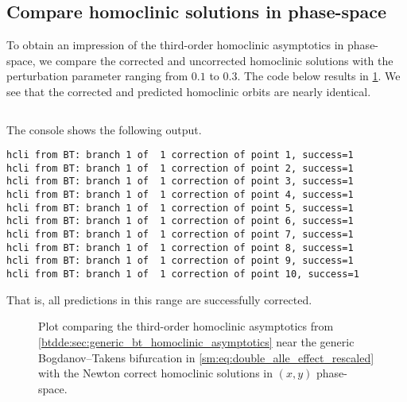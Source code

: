 \subsection{Compare homoclinic solutions in phase-space}
To obtain an impression of the third-order homoclinic asymptotics in
phase-space, we compare the corrected and uncorrected homoclinic solutions
with the perturbation parameter ranging from $0.1$ to $0.3$.
The code below results in \cref{sm:fig:DoubleAlleeEffectCompareOrbitsPhaseSpace}.
We see that the corrected and predicted homoclinic orbits are nearly identical.
\inputminted[firstline=166, lastline=182]{MATLAB}{\pathToDDEBifToolDemos/predator_prey/predator_prey.m}
The \MATLAB console shows the following output.
\begin{verbatim}
hcli from BT: branch 1 of  1 correction of point 1, success=1
hcli from BT: branch 1 of  1 correction of point 2, success=1
hcli from BT: branch 1 of  1 correction of point 3, success=1
hcli from BT: branch 1 of  1 correction of point 4, success=1
hcli from BT: branch 1 of  1 correction of point 5, success=1
hcli from BT: branch 1 of  1 correction of point 6, success=1
hcli from BT: branch 1 of  1 correction of point 7, success=1
hcli from BT: branch 1 of  1 correction of point 8, success=1
hcli from BT: branch 1 of  1 correction of point 9, success=1
hcli from BT: branch 1 of  1 correction of point 10, success=1
\end{verbatim}
That is, all predictions in this range are successfully corrected.
%
\begin{figure}[ht]
    \centering
    \caption{Plot comparing the third-order homoclinic asymptotics from
    \cref{btdde:sec:generic_bt_homoclinic_asymptotics} near the generic
    Bogdanov--Takens bifurcation in \cref{sm:eq:double_alle_effect_rescaled} with
    the Newton correct homoclinic solutions in $(x,y)$ phase-space.}
    \label{sm:fig:DoubleAlleeEffectCompareOrbitsPhaseSpace}
\end{figure}

